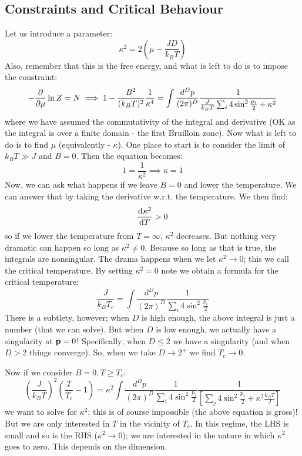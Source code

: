 \subsection{Constraints and Critical Behaviour}
Let us introduce a parameter:
\begin{equation}
    \kappa^2 = 2\left(\mu - \frac{JD}{k_B T}\right)
\end{equation}
Also, remember that this is the free energy, and what is left to do is to impose the constraint:
\begin{equation}
    -\frac{\partial }{\partial \mu}\ln Z = N \implies 1 - \frac{B^2}{(k_B T)^2}\frac{1}{\kappa^4} = \int \frac{d^Dp}{(2\pi)^D} \frac{1}{\frac{J}{k_B T}\sum_i 4\sin^2\frac{p_i}{2} + \kappa^2}
\end{equation}
where we have assumed the commutativity of the integral and derivative (OK as the integral is over a finite domain - the first Bruilloin zone). Now what is left to do is to find $\mu$ (equivalently - $\kappa$). One place to start is to consider the limit of $k_B T \gg J$ and $B = 0$. Then the equation becomes:
\begin{equation}
    1 = \frac{1}{\kappa^2} \implies \kappa = 1
\end{equation}
Now, we can ask what happens if we leave $B = 0$ and lower the temperature. We can answer that by taking the derivative w.r.t. the temperature. We then find:
\begin{equation}
    \dod{\kappa^2}{T} > 0
\end{equation}
so if we lower the temperature from $T = \infty$, $\kappa^2$ decreases. But nothing very dramatic can happen so long as $\kappa^2 \neq 0$. Because so long as that is true, the integrals are nonsingular. The drama happens when we let $\kappa^2 \to 0$; this we call the critical temperature. By setting $\kappa^2 = 0$ note we obtain a formula for the critical temperature:
\begin{equation}
    \frac{J}{k_B T_c} = \int \frac{d^Dp}{(2\pi)^D}\frac{1}{\sum_i 4 \sin^2 \frac{p_i}{2}}
\end{equation}
There is a subtlety, however; when $D$ is high enough, the above integral is just a number (that we can solve). But when $D$ is low enough, we actually have a singularity at $\mathbf{p} = 0$! Specifically; when $D \leq 2$ we have a singularity (and when $D > 2$ things converge). So, when we take $D \to 2^+$ we find $T_c \to 0$. 

Now if we consider $B = 0, T \geq T_c$:
\begin{equation}
    \left(\frac{J}{k_B T}\right)^2 \left(\frac{T}{T_c} - 1\right) = \kappa^2 \int \frac{d^Dp}{(2\pi)^D}\frac{1}{\sum_i 4\sin^2 \frac{p_i}{2}}\frac{1}{\left[\sum_j 4 \sin^2 \frac{p_j}{2} + \kappa^2 \frac{k_B T}{J}\right]}
\end{equation}
we want to solve for $\kappa^2$; this is of course impossible (the above equation is gross)! But we are only interested in $T$ in the vicinity of $T_c$. In this regime, the LHS is small and so is the RHS ($\kappa^2 \to 0$); we are interested in the nature in which $\kappa^2$ goes to zero. This depends on the dimension. 

